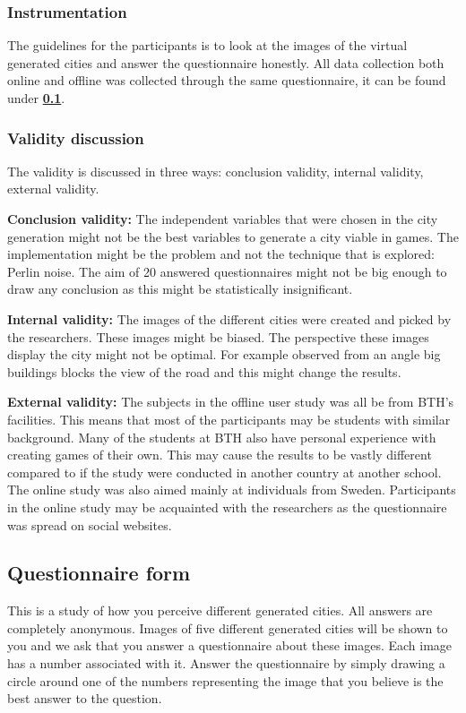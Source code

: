 	\subsubsection{Instrumentation}
	The guidelines for the participants is to look at the images of the virtual generated cities and answer the questionnaire honestly. All data collection both online and offline was collected through the same questionnaire, it can be found under \textbf{\ref{ssssec:questionnaire}}.
			
	\subsubsection{Validity discussion} 
	The validity is discussed in three ways: conclusion validity, internal validity, external validity. \cite{ExperimentationInSoftware}
	
	\textbf{Conclusion validity:} The independent variables that were chosen in the city generation might not be the best variables to generate a city viable in games. The implementation might be the problem and not the technique that is explored: Perlin noise. The aim of 20 answered questionnaires might not be big enough to draw any conclusion as this might be statistically insignificant.
	
	\textbf{Internal validity:} The images of the different cities were created and picked by the researchers. These images might be biased. The perspective these images display the city might not be optimal. For example observed from an angle big buildings blocks the view of the road and this might change the results.
	
	\textbf{External validity:} The subjects in the offline user study was all be from BTH’s facilities. This means that most of the participants may be students with similar background. Many of the students at BTH also have personal experience with creating games of their own. This may cause the results to be vastly different compared to if the study were conducted in another country at another school. The online study was also aimed mainly at individuals from Sweden. Participants in the online study may be acquainted with the researchers as the questionnaire was spread on social websites.
			
	\subsection{Questionnaire form} \label{ssssec:questionnaire}
	This is a study of how you perceive different generated cities. All answers are completely anonymous. Images of five different generated cities will be shown to you and we ask that you answer a questionnaire about these images. Each image has a number associated with it. Answer the questionnaire by simply drawing a circle around one of the numbers representing the image that you believe is the best answer to the question.
			
